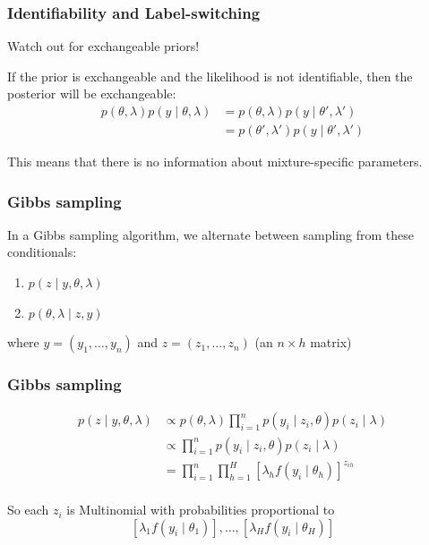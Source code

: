 \documentclass{beamer}
\begin{document}
\begin{frame}
\frametitle{Identifiability and Label-switching}

Watch out for exchangeable priors!
\newline

If the prior is exchangeable and the likelihood is not identifiable, then the posterior will be exchangeable:
\begin{align*}
p(\theta, \lambda) p(y \mid \theta, \lambda) &= p(\theta, \lambda) p(y \mid \theta', \lambda') \tag{label switching} \\
&= p(\theta', \lambda') p(y \mid \theta', \lambda') \tag{exchangeable prior}
\end{align*}
\pause

This means that there is no information about mixture-specific parameters.
\end{frame}
\begin{frame}
\frametitle{Gibbs sampling}

In a Gibbs sampling algorithm, we alternate between sampling from these conditionals:
\begin{enumerate}
\item $p(z \mid y, \theta, \lambda) $
\item $p(\theta, \lambda \mid z, y)$
\end{enumerate}
where $y = (y_1, \ldots, y_n)$ and $z = (z_1, \ldots, z_n)$ (an $n \times h$ matrix)


\end{frame}


\begin{frame}
\frametitle{Gibbs sampling}

\begin{align*}
p(z \mid y, \theta, \lambda) &\propto p(\theta, \lambda)\prod_{i=1}^n p(y_i \mid z_i, \theta) p(z_i \mid \lambda) \\
&\propto \prod_{i=1}^n p(y_i \mid z_i, \theta) p(z_i \mid \lambda) \\
&= \prod_{i=1}^n \prod_{h=1}^H \left[ \lambda_h f(y_i \mid \theta_h)\right]^{z_{ih} } \\
\end{align*}

So each $z_i$ is Multinomial with probabilities proportional to
$$
[\lambda_1 f(y_i \mid \theta_1)], \ldots, [\lambda_H f(y_i \mid \theta_H)]
$$
\end{frame}
\end{document}
